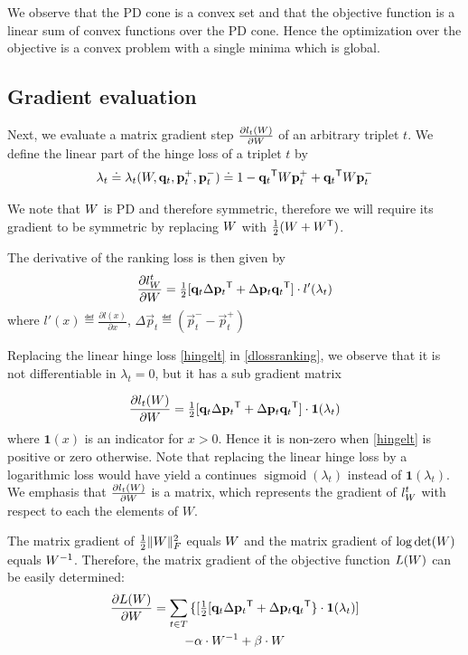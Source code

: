 \documentclass{article}
\begin{document}
We observe that the PD cone is a convex set and that the objective function is a linear sum of convex functions over the PD cone. Hence the optimization over the objective is a convex problem with a single minima which is global.

\subsection{Gradient evaluation}
Next, we evaluate a matrix gradient step  $\frac{\partial {l_t ({W})}}{\partial {W}}$ of an arbitrary triplet $t$. We define the linear part of the hinge loss of a triplet $t$ by
\begin{equation}
\lambda_t \doteq \lambda_t({W}, \mathbf{q}_t, \mathbf{p}_{t}^{+}, \mathbf{p}_{t}^{-}) \doteq 1-\mathbf{q}_{t}{}^\mathsf{T} {W} \mathbf{p}_{t}^{+}+\mathbf{q}_{t}{}^\mathsf{T}{W}\mathbf{p}_{t}^{-}
\end{equation}

We note that ${W}$ is PD and therefore symmetric, therefore we will require its gradient to be symmetric by replacing ${W}$ with $\tfrac{1}{2}({W} + {W}{}^\mathsf{T})$.

The derivative of the ranking loss is then given by
\begin{equation}
\frac{\partial {l_{{W}}^{t}}}{\partial {W}} = \tfrac{1}{2}[\mathbf{q}_{t}\Delta\mathbf{p}_{t}{}^\mathsf{T}  + \Delta\mathbf{p}_{t}\mathbf{q}_{t}{}^\mathsf{T}]\cdot {l'}(\lambda_t)
\label{dlossranking}
\end{equation} where $l'(x) \eqdef \frac{\partial {l(x)}}{\partial x}$, $\Delta\vec{p}_{t} \eqdef (\vec{p}_{t}^{-} - \vec{p}_{t}^{+})$

Replacing the linear hinge loss \eqref{hingelt} in \eqref{dlossranking}, we observe that it is not differentiable in $\lambda_t = 0$, but it has a sub gradient matrix

\begin{equation}
\frac{\partial {l_t ({W})}}{\partial {W}} = \tfrac{1}{2}[\mathbf{q}_{t}\Delta\mathbf{p}_{t}{}^\mathsf{T}  + \Delta\mathbf{p}_{t}\mathbf{q}_{t}{}^\mathsf{T}] \cdot \textbf{1}(\lambda_t)
\end{equation}
where $\textbf{1}(x)$ is an indicator for $x>0$. Hence it is non-zero when \eqref{hingelt} is positive or zero otherwise. Note that replacing the linear hinge loss by a logarithmic loss would have yield a continues $\operatorname{sigmoid}(\lambda_t)$ instead of $\textbf{1}(\lambda_t)$.  We emphasis that 
$\frac{\partial {l_t ({W})}}{\partial {W}}$ is a matrix, which represents the gradient of $l_{{W}}^{t}$ with respect to each the elements of $W$.

The matrix gradient of $\tfrac{1}{2} \| {W} \|_{F}^{2}$ equals ${W}$ and the matrix gradient of  $\log \det({W})$ equals ${W}^{-1}$. Therefore, the matrix gradient of the objective function $L({W})$ can be easily determined: 
\begin{multline}
\frac{\partial {L ({W})}}{\partial {W}} = 
\sum\limits_{t\in T}{\{ [\tfrac{1}{2}[\mathbf{q}_{t}\Delta\mathbf{p}_{t}{}^\mathsf{T} + \Delta\mathbf{p}_{t}\mathbf{q}_{t}{}^\mathsf{T} \} } \cdot \textbf{1}(\lambda_t)] \\- \alpha \cdot {W}^{-1} + \beta \cdot {W} 
\label{gradMat}
\end{multline}
\end{document}
